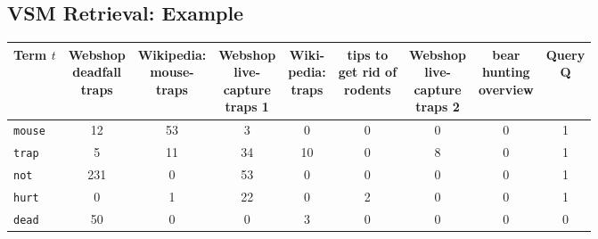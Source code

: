         \subsection{VSM Retrieval: Example} %
            \begin{table}[H]
                \centering
                \begin{tabular}{|l|c|c|c|c|c|c|c||c|}
                    \hline
                    \textbf{Term} \(t\) & \makecell{Webshop \\ deadfall \\ traps} & \makecell{Wikipedia: \\ mouse- \\ traps} & \makecell{Webshop \\ live- \\ capture \\ traps 1} & \makecell{Wiki- \\ pedia: \\ traps} & \makecell{tips to \\ get rid of \\ rodents} & \makecell{Webshop \\ live- \\ capture \\ traps 2} & \makecell{bear \\ hunting \\ overview} & \makecell{Query \\ Q} \\ \hline
                    \texttt{mouse}  &         12         &         53         &         3          & \textcolor{irl}{0} & \textcolor{irl}{0} & \textcolor{irl}{0} & \textcolor{irl}{0} & 1 \\ \hline
                    \texttt{trap}   &         5          &         11         &         34         &         10         & \textcolor{irl}{0} &         8          & \textcolor{irl}{0} & 1 \\ \hline
                    \texttt{not}    &        231         & \textcolor{irl}{0} &         53         & \textcolor{irl}{0} & \textcolor{irl}{0} & \textcolor{irl}{0} & \textcolor{irl}{0} & 1 \\ \hline
                    \texttt{hurt}   & \textcolor{irl}{0} &         1          &         22         & \textcolor{irl}{0} &         2          & \textcolor{irl}{0} & \textcolor{irl}{0} & 1 \\ \hline
                    \texttt{dead}   &         50         & \textcolor{irl}{0} & \textcolor{irl}{0} &         3          & \textcolor{irl}{0} & \textcolor{irl}{0} & \textcolor{irl}{0} & 0 \\ \hline

\end{tabular}
\end{table}
